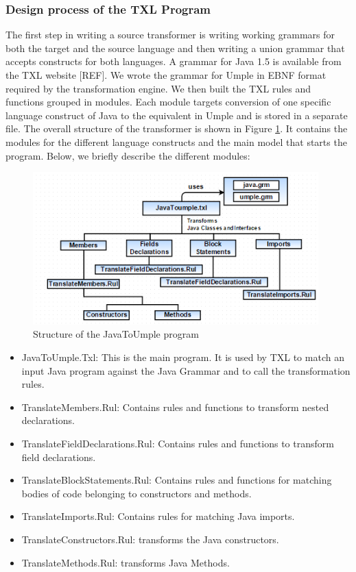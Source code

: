 \subsubsection{Design process of the TXL Program}

The first step in writing a source transformer is writing working grammars for both the target and the source language and then writing a union grammar that accepts constructs for both languages. A grammar for Java 1.5 is available from the TXL website [REF]. We wrote the grammar for Umple in EBNF format required by the transformation engine. We then built the TXL rules and functions grouped in modules. Each module targets conversion of one specific language construct of Java to the equivalent in Umple and is stored in a separate file. The overall structure of the transformer is shown in Figure \ref{fig:txlStructure}. It contains the modules for the different language constructs and the main model that starts the program. Below, we briefly describe the different modules:

\begin{figure}[h]
\centering
\includegraphics[width=0.98\textwidth]{Figures/TXL_STRUCTURE.png} 
\caption{Structure of the JavaToUmple program}
\label{fig:txlStructure}
\end{figure}

\begin{itemize}
\item JavaToUmple.Txl: This is the main program. It is used by TXL to match an input Java program against the Java Grammar and to call the transformation rules.
\item TranslateMembers.Rul: Contains rules and functions to transform nested declarations.
\item TranslateFieldDeclarations.Rul: Contains rules and functions to transform field declarations.
\item  TranslateBlockStatements.Rul: Contains rules and functions for matching bodies of code belonging to constructors and methods.
\item TranslateImports.Rul: Contains rules for matching Java imports.
\item TranslateConstructors.Rul: transforms the Java constructors.
\item TranslateMethods.Rul: transforms Java Methods.
\end{itemize}

